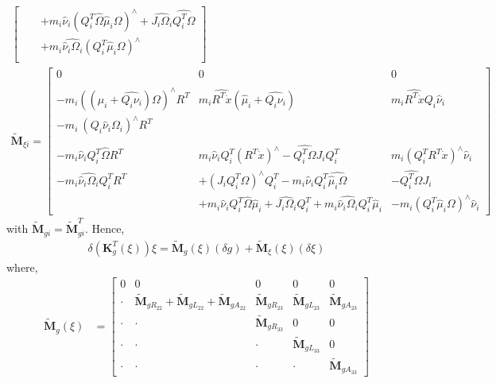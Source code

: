 \documentclass[10pt]{article}
\begin{document}
\begin{itemize}
\begin{align*}
\begin{bmatrix}
& & + m_i \hat\nu_i(Q_i^T \hat{\Omega}\hat\mu_i\Omega)^\wedge + \widehat{J_i \Omega_i}\widehat{Q_i^T \Omega} \\
& & + m_i \widehat{\hat{\nu}_i\Omega_i} (Q_i^T \hat\mu_i \Omega)^\wedge \\
\end{bmatrix}
\\
\tilde{\mathbf{M}}_{\xi i} = \begin{bmatrix}
0 & 0 & 0 \\\\
-m_i((\hat\mu_i + \widehat{Q_i\nu_i}) \Omega)^\wedge R^T &  m_i \widehat{R^T \dot{x}} (\hat{\mu}_i + \widehat{Q_i\nu_i})
& m_i\widehat{R^T \dot{x}}Q_i\hat\nu_i\\
-m_i \ (Q_i \hat{\nu}_i \Omega_i)^\wedge R^T  & &
\\\\
-m_i \hat{\nu}_iQ_i^T\hat{\Omega}R^T &  m_i \hat{\nu}_i Q_i^T (R^T \dot{x})^\wedge - \widehat{Q_i^T\Omega}J_iQ_i^T &  m_i (Q_i^T R^T \dot{x})^\wedge \hat\nu_i \\
-m_i \widehat{\hat\nu_i\Omega_i} Q_i^T R^T & + (J_iQ_i^T\Omega)^\wedge Q_i^T -m_i\hat\nu_i Q_i^T \widehat{\hat\mu_i \Omega} & -\widehat{Q_i^T \Omega} J_i \\
& +m_i\hat{\nu}_i Q_i^T \hat{\Omega} \hat\mu_i + \widehat{J_i\Omega_i}Q_i^T + m_i\widehat{\hat\nu_i \Omega_i} Q_i^T\hat\mu_i & - m_i(Q_i^T \hat\mu_i \Omega)^\wedge\hat\nu_i
\end{bmatrix}
\end{align*}
with $ \tilde{\mathbf{M}}_{gi} = \tilde{\mathbf{M}}_{gi}^T $. Hence,
\begin{align*}
\delta(\mathbf{K}^T_g(\xi)) \xi = \tilde{\mathbf{M}}_g(\xi) (\delta g) + \tilde{\mathbf{M}}_\xi(\xi) (\delta \xi)
\end{align*}
where,
\begin{align}
{\tilde{\mathbf{M}}_g}(\xi) &= \begin{bmatrix}
0 & 0 & 0 & 0 & 0\\
\cdot & \tilde{\mathbf{M}}_{gR_{22}} + \tilde{\mathbf{M}}_{gL_{22}} + \tilde{\mathbf{M}}_{gA_{22}} & \tilde{\mathbf{M}}_{gR_{23}} & \tilde{\mathbf{M}}_{gL_{23}} & \tilde{\mathbf{M}}_{gA_{23}} \\
\cdot & \cdot & \tilde{\mathbf{M}}_{gR_{33}} & 0 & 0 \\
\cdot & \cdot & \cdot & \tilde{\mathbf{M}}_{gL_{33}} & 0 \\
\cdot & \cdot & \cdot & \cdot & \tilde{\mathbf{M}}_{gA_{33}}
\end{bmatrix}

\end{align}
\end{itemize}
\end{document}
